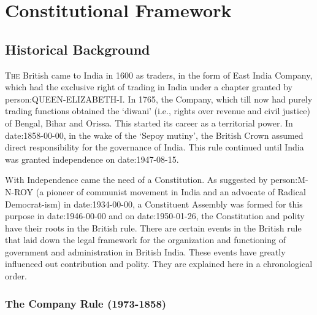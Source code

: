 %

\thispagestyle{empty}
\part{Constitutional Framework}
\restoregeometry
\cleardoublepage

%

\chapter{Historical Background}

\begin{multicols}{2}

\lettrine[lines=3,nindent=0pt]{T}{he} British came to India in 1600 as traders, in the form of East India Company, which had the exclusive right of trading in India under a chapter granted by \gls{person:QUEEN-ELIZABETH-I}. In 1765, the Company, which till now had purely trading functions obtained the `diwani' (i.e., rights over revenue and civil justice) of Bengal, Bihar and Orissa. This started its career as a territorial power. In \gls{date:1858-00-00}, in the wake of the `Sepoy mutiny', the British Crown assumed direct responsibility for the governance of India. This rule continued until India was granted independence on \gls{date:1947-08-15}.

With Independence came the need of a Constitution. As suggested by \gls{person:M-N-ROY} (a pioneer of communist movement in India and an advocate of Radical Democrat-ism) in \gls{date:1934-00-00}, a Constituent Assembly was formed for this purpose in \gls{date:1946-00-00} and on \gls{date:1950-01-26}, the Constitution and polity have their roots in the British rule. There are certain events in the British rule that laid down the legal framework for the organization and functioning of government and administration in British India. These events have greatly influenced out contribution and polity. They are explained here in a chronological order.

\section{The Company Rule (1973-1858)}

\end{multicols}
